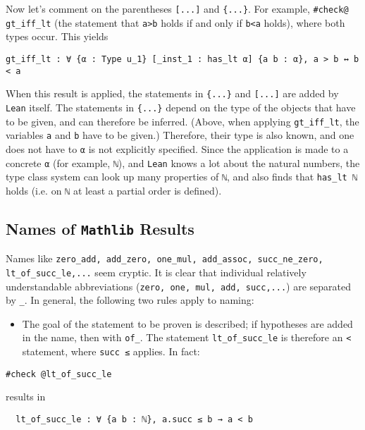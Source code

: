 \documentclass{memoir}
\begin{document}
Now let's comment on the parentheses \Verb|[...]| and \Verb|{...}|. For example, \Verb|#check@ gt_iff_lt| (the statement that \Verb|a>b| holds if and only if \Verb|b<a| holds), where both types occur. This yields

\begin{verbatim}
gt_iff_lt : ∀ {α : Type u_1} [_inst_1 : has_lt α] {a b : α}, a > b ↔ b < a

\end{verbatim}


When this result is applied, the statements in \Verb|{...}| and \Verb|[...]| are added by \Verb|Lean| itself. The statements in \Verb|{...}| depend on the type of the objects that have to be given, and can therefore be inferred. (Above, when applying \Verb|gt_iff_lt|, the variables \Verb|a| and \Verb|b| have to be given.) Therefore, their type is also known, and one does not have to \Verb|α| is not explicitly specified. Since the application is made to a concrete \Verb|α| (for example, \Verb|ℕ|), and \Verb|Lean| knows a lot about the natural numbers, the type class system can look up many properties of \Verb|ℕ|, and also finds that \Verb|has_lt ℕ| holds (i.e. on \Verb|ℕ| at least a partial order is defined).



\subsection{Names of \Verb|Mathlib| Results}

Names like \Verb|zero_add, add_zero, one_mul, add_assoc, succ_ne_zero, lt_of_succ_le,...| seem cryptic. It is clear that individual relatively understandable abbreviations (\Verb|zero, one, mul, add, succ,...|) are separated by \Verb|_|. In general, the following two rules apply to naming:

\begin{itemize}
\item The goal of the statement to be proven is described; if hypotheses are added in the name, then with \Verb|of_|. The statement \Verb|lt_of_succ_le| is therefore an \Verb|<| statement, where \Verb|succ ≤| applies. In fact:
\end{itemize}


\begin{verbatim}
#check @lt_of_succ_le

\end{verbatim}


results in

\begin{verbatim}
  lt_of_succ_le : ∀ {a b : ℕ}, a.succ ≤ b → a < b

\end{verbatim}
\end{document}
